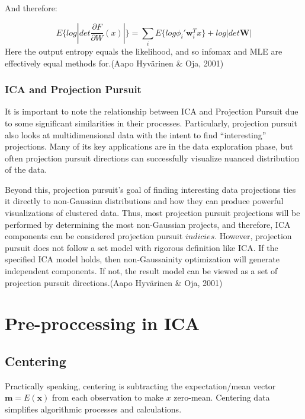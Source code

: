 \documentclass[12pt,twoside]{amherstthesis}
\begin{document}
  And therefore:
  
  \[\textit{E}\{log | det \frac{\partial F}{\partial W}(x)|\} = \sum_{i} \textit{E}\{log \phi_i' \textbf{w}_i^Tx\} + log|det\textbf{W}|\]
  Here the output entropy equals the likelihood, and so infomax and MLE
  are effectively equal methods for.(Aapo Hyvärinen \& Oja, 2001)
  
  \subsubsection{ICA and Projection
  Pursuit}\label{ica-and-projection-pursuit}
  
  It is important to note the relationship between ICA and Projection
  Pursuit due to some significant similarities in their processes.
  Particularly, projection pursuit also looks at multidimensional data
  with the intent to find ``interesting'' projections. Many of its key
  applications are in the data exploration phase, but often projection
  pursuit directions can successfully visualize nuanced distribution of
  the data.
  
  Beyond this, projection pursuit's goal of finding interesting data
  projections ties it directly to non-Gaussian distributions and how they
  can produce powerful visualizations of clustered data. Thus, most
  projection pursuit projections will be performed by determining the most
  non-Gaussian projects, and therefore, ICA components can be considered
  projection pursuit \(\textit{indicies}\). However, projection pursuit
  does not follow a set model with rigorous definition like ICA. If the
  specified ICA model holds, then non-Gaussainity optimization will
  generate independent components. If not, the result model can be viewed
  as a set of projection pursuit directions.(Aapo Hyvärinen \& Oja, 2001)
  
  \section{Pre-proccessing in ICA}\label{pre-proccessing-in-ica}
  
  \subsection{Centering}\label{centering}
  
  Practically speaking, centering is subtracting the expectation/mean
  vector \(\textbf{m} = E({\textbf{x}})\) from each observation to make
  \(x\) zero-mean. Centering data simplifies algorithmic processes and
  calculations.
  
\end{document}
